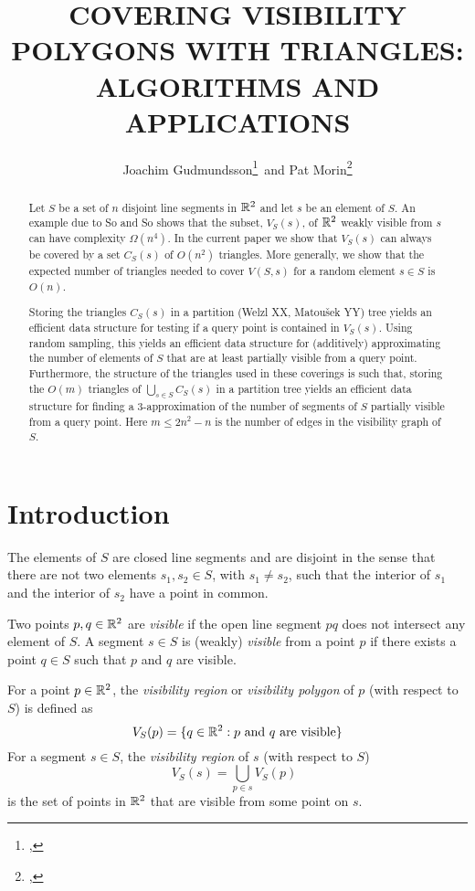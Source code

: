 \documentclass{patmorin}
\title{\MakeUppercase{Covering Visibility Polygons with Triangles:\newline
       Algorithms and Applications}}
\author{Joachim Gudmundsson\thanks{\affil{NICTA},
\email{joachim.gudmundsson@nicta.com.au}}\, 
       and Pat Morin\thanks{\affil{Carleton University},
\email{morin@scs.carleton.ca}}}
\begin{document}
\maketitle
\begin{abstract}
Let $S$ be a set of $n$ disjoint line segments in $\mathbb{R}^2$ and let $s$
be an element of $S$.  An example due to So and So shows that the
subset, $V_S(s)$, of $\mathbb{R}^2$ weakly visible from $s$ can have complexity
$\Omega(n^4)$.  In the current paper we show that $V_S(s)$ can always
be covered by a set $C_S(s)$ of $O(n^2)$ triangles.  More generally,
we show that the expected number of triangles needed to cover $V(S,s)$
for a random element $s\in S$ is $O(n)$.

Storing the triangles $C_S(s)$ in a partition (Welzl XX, Matou\v{s}ek YY)
tree yields an efficient data structure for testing if a query point is
contained in $V_S(s)$. Using random sampling, this yields an efficient
data structure for (additively) approximating the number of elements of
$S$ that are at least partially visible from a query point.  Furthermore,
the structure of the triangles used in these coverings is such that,
storing the $O(m)$ triangles of $\bigcup_{s\in S} C_S(s)$ in a partition
tree yields an efficient data structure for finding a 3-approximation
of the number of segments of $S$ partially visible from a query point.
Here $m\le 2n^2-n$ is the number of edges in the visibility graph of $S$.
\end{abstract}

\section{Introduction}

The elements of $S$ are closed line segments and are disjoint in the sense
that there are not two elements $s_1,s_2\in S$, with $s_1\neq s_2$, such
that the interior of $s_1$ and the interior of $s_2$ have a point in
common.

Two points $p,q\in\mathbb{R}^2$ are \emph{visible} if the open line segment $pq$
does not intersect any element of $S$.  A segment $s\in S$ is (weakly)
\emph{visible} from a point $p$ if there exists a point $q\in S$ such that
$p$ and $q$ are visible.

For a point $p\in\mathbb{R}^2$, the \emph{visibility region} or \emph{visibility
polygon} of $p$ (with respect to $S$) is defined as
\[
   V_S(p)=\{q\in\mathbb{R}^2:\mbox{$p$ and $q$ are visible}\}
\]
For a segment $s\in S$, the \emph{visibility region} of $s$ (with respect
to $S$)
\[
   V_S(s)=\bigcup_{p\in s} V_S(p) \enspace 
\]
is the set of points in $\mathbb{R}^2$ that are visible from some point on $s$.
\end{document}
